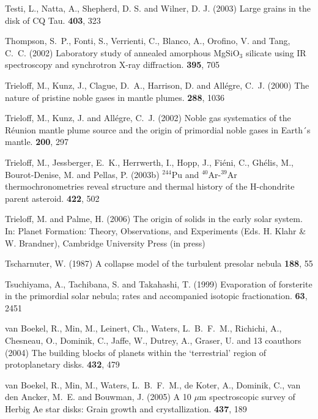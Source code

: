 \begin{literature}
\item
Testi, L., Natta, A., Shepherd, D. S. and Wilner, D. J. (2003)
Large grains in the disk of CQ Tau. \aap \textbf{403}, 323

\item
Thompson, S.~P., Fonti, S., Verrienti, C., Blanco, A., Orofino, V. and Tang,
C.~C. (2002) Laboratory study of annealed amorphous MgSiO$_3$ silicate using
IR spectroscopy and synchrotron X-ray diffraction. \aap \textbf{395}, 705

\item
Trieloff, M., Kunz, J., Clague, D.~A., Harrison, D. and All\'egre, C.~J. (2000)
The nature of pristine noble gases in mantle plumes. \sci \textbf{288}, 1036

\item
Trieloff, M., Kunz, J. and All\'egre, C.~J. (2002) Noble gas systematics of
the R\'eunion mantle plume source and the origin of primordial noble gases
in Earth´s mantle. \epsl \textbf{200}, 297

\item
Trieloff, M., Jessberger, E.~K., Herrwerth, I., Hopp, J., Fi\'eni, C.,
Gh\'elis, M., Bourot-Denise, M. and Pellas, P. (2003b) $^{244}$Pu and
$^{40}$Ar-$^{39}$Ar thermochronometries reveal structure and thermal history
of the H-chondrite parent asteroid. \nat \textbf{422}, 502

\item
Trieloff, M. and Palme, H. (2006) The origin of solids in the early solar
system. In: Planet Formation: Theory, Observations, and Experiments
(Eds. H.  Klahr \& W. Brandner), Cambridge University Press (in press)

\item
Tscharnuter, W. (1987) A collapse model of the turbulent presolar nebula
\aap \textbf{188}, 55

\item
Tsuchiyama, A., Tachibana, S. and Takahashi, T. (1999) Evaporation of
forsterite in the primordial solar nebula; rates and accompanied isotopic
fractionation.
\gca \textbf{63}, 2451

\item
van Boekel, R., Min, M., Leinert, Ch., Waters, L.~B.~F.~M., Richichi, A.,
Chesneau, O., Dominik, C., Jaffe, W., Dutrey, A., Graser, U. and 13
coauthors (2004) The building blocks of planets within the `terrestrial'
region of protoplanetary disks. \nat \textbf{432}, 479

\item
van Boekel, R., Min, M., Waters, L.~B.~F.~M., de Koter, A., Dominik, C., van
den Ancker, M.~E. and Bouwman, J. (2005) A 10 $\mu$m spectroscopic survey of
Herbig Ae star disks: Grain growth and crystallization. \aap \textbf{437},
189


\end{literature}
